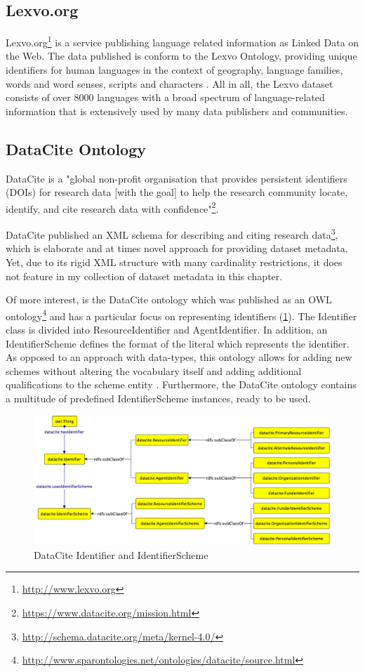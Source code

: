 \documentclass[a4paper,english,twoside,BCOR1.5cm,headsepline,DIV12,appendixprefix,final,12pt]{scrbook}
\newcommand\footnoteurl[1]{\footnote{\scriptsize\url{#1}}}
\begin{document}
\subsection{Lexvo.org}
\label{sec:lexvo}
Lexvo.org\footnoteurl{http://www.lexvo.org} is a service publishing language related information as Linked Data on the Web. The data published is conform to the Lexvo Ontology, providing unique identifiers for human languages in the context of geography, language families, words and word senses, scripts and characters \cite{Lexvo2015DeMelo}. All in all, the Lexvo dataset consists of over 8000 languages with a broad spectrum of language-related information that is extensively used by many data publishers and communities.


\subsection{DataCite Ontology}
\label{sec:dcid}
DataCite is a "global non-profit organisation that provides persistent identifiers (DOIs) for research data [with the goal] to help the research community locate, identify, and cite research data with confidence"\footnoteurl{https://www.datacite.org/mission.html}. 

DataCite published an XML schema for describing and citing research data\footnoteurl{http://schema.datacite.org/meta/kernel-4.0/}, which is elaborate and at times novel approach for providing dataset metadata. Yet, due to its rigid XML structure with many cardinality restrictions, it does not feature in my collection of dataset metadata in this chapter. 

Of more interest, is the DataCite ontology which was published as an OWL ontology\footnoteurl{http://www.sparontologies.net/ontologies/datacite/source.html} and has a particular focus on representing identifiers (\cref{fig:dcid}). The Identifier class is divided into ResourceIdentifier and AgentIdentifier. In addition, an IdentifierScheme defines the format of the literal which represents the identifier. As opposed to an approach with data-types, this ontology allows for adding new schemes without altering the vocabulary itself and adding additional qualifications to the scheme entity \cite{Peroni2016}. Furthermore, the DataCite ontology contains a multitude of predefined IdentifierScheme instances, ready to be used. 


\begin{figure}[t]
\centering
  \includegraphics[width=\textwidth]{images/DataCiteIdentifiers.png}
  \caption{DataCite Identifier and IdentifierScheme}
  \label{fig:dcid}
\end{figure}
\end{document}
